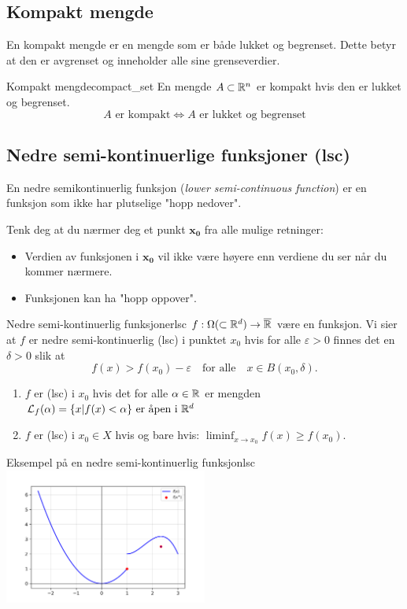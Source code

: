 \subsection{Kompakt mengde}
En kompakt mengde er en mengde som er både lukket og begrenset. Dette betyr at den er avgrenset og inneholder alle sine grenseverdier.

\begin{definition}{Kompakt mengde}{compact_set}
  En mengde \(A \subset \mathbb{R}^n\) er kompakt hvis den er lukket og begrenset.
  \[
    A \text{ er kompakt} \Leftrightarrow A \text{ er lukket og begrenset}
  \]
\end{definition}

\subsection{Nedre semi-kontinuerlige funksjoner (lsc)}

En nedre semikontinuerlig funksjon (\textit{lower semi-continuous function}) er en funksjon som ikke har plutselige "hopp nedover".

Tenk deg at du nærmer deg et punkt \( \symbf{x_0} \) fra alle mulige retninger:
\begin{itemize}
  \item Verdien av funksjonen i \( \symbf{x_0} \) vil ikke være høyere enn verdiene du ser når du kommer nærmere.
  \item Funksjonen kan ha "hopp oppover".
\end{itemize}


\begin{definition}{Nedre semi-kontinuerlig funksjoner}{lsc}
  \(f: \Omega (\subset \mathbb{R}^d) \to \overline{\mathbb{R}}\) være en funksjon. Vi sier at \(f\) er nedre semi-kontinuerlig (lsc) i punktet \(x_0\) hvis for alle \(\varepsilon > 0\) finnes det en \(\delta > 0\) slik at
  \[
    f(x) > f(x_0) - \varepsilon \quad \text{for alle} \quad x \in B(x_0, \delta).
  \]
  \begin{enumerate}
    \item \(f\) er (lsc) i \(x_0\) hvis det for alle \(\alpha \in \mathbb{R}\) er mengden \(\mathcal{L}_f(\alpha) = \{x | f(x) < \alpha \} \text{ er åpen i } \mathbb{R}^d\)
    \item \(f\) er (lsc) i \(x_0 \in X\) hvis og bare hvis: \(\liminf_{x \to x_0} f(x) \geq f(x_0)\).
  \end{enumerate}
\end{definition}
\begin{example}{Eksempel på en nedre semi-kontinuerlig funksjon}{lsc}
  \includegraphics[width=0.5\textwidth]{figures/example_lsc.png}
\end{example}

